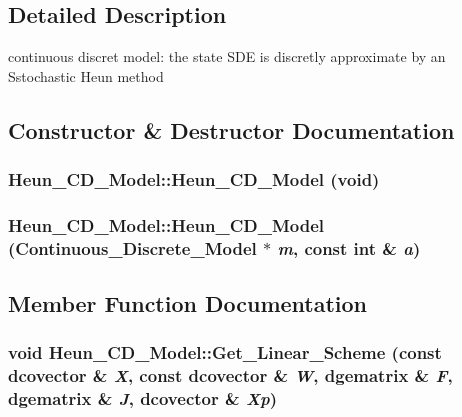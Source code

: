 \subsection{Detailed Description}
continuous discret model: the state SDE is discretly approximate by an Sstochastic Heun method 

\subsection{Constructor \& Destructor Documentation}
\hypertarget{class_heun___c_d___model_1fa492e132304f4dbd1c722c1cd0d9a5}{
\subsubsection[{Heun\_\-CD\_\-Model}]{\setlength{\rightskip}{0pt plus 5cm}Heun\_\-CD\_\-Model::Heun\_\-CD\_\-Model (void)}}
\label{class_heun___c_d___model_1fa492e132304f4dbd1c722c1cd0d9a5}


\hypertarget{class_heun___c_d___model_4a6a03c0d4fd6381c0ba150761cec1cc}{
\subsubsection[{Heun\_\-CD\_\-Model}]{\setlength{\rightskip}{0pt plus 5cm}Heun\_\-CD\_\-Model::Heun\_\-CD\_\-Model ({\bf Continuous\_\-Discrete\_\-Model} $\ast$ {\em m}, \/  const int \& {\em a})}}
\label{class_heun___c_d___model_4a6a03c0d4fd6381c0ba150761cec1cc}




\subsection{Member Function Documentation}
\hypertarget{class_heun___c_d___model_38c51141d41b3c92509ab2c6040fd2cd}{
\subsubsection[{Get\_\-Linear\_\-Scheme}]{\setlength{\rightskip}{0pt plus 5cm}void Heun\_\-CD\_\-Model::Get\_\-Linear\_\-Scheme (const dcovector \& {\em X}, \/  const dcovector \& {\em W}, \/  dgematrix \& {\em F}, \/  dgematrix \& {\em J}, \/  dcovector \& {\em Xp})}}
\label{class_heun___c_d___model_38c51141d41b3c92509ab2c6040fd2cd}


